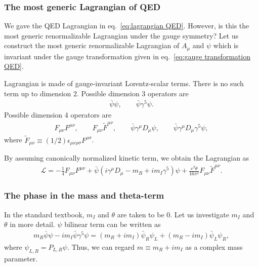 \documentclass[11pt,a4paper]{article}
\begin{document}
\subsubsection{The most generic Lagrangian of QED}
We gave the QED Lagrangian in eq.~\eqref{eq:lagrangian QED}. However, is this the most generic renormalizable Lagrangian under the gauge symmetry?
Let us construct the most generic renormalizable Lagrangian of $A_\mu$ and $\psi$ which is invariant under the gauge transformation given in eq.~\eqref{eq:gauge transformation QED}.

Lagrangian is made of gauge-invariant Lorentz-scalar terms. There is no such term up to dimension 2.
Possible dimension 3 operators are
\begin{align}
    \bar\psi \psi, \qquad
    \bar\psi \gamma^5 \psi.
\end{align}
Possible dimension 4 operators are
\begin{align}
    F_{\mu\nu} F^{\mu\nu}, \qquad
    F_{\mu\nu} \tilde F^{\mu\nu}, \qquad
    \bar\psi \gamma^\mu D_\mu \psi, \qquad
    \bar\psi \gamma^\mu D_\mu \gamma^5 \psi,
\end{align}
where $\tilde F_{\mu\nu} \equiv (1/2) \epsilon_{\mu\nu\rho\sigma} F^{\rho\sigma}$.

By assuming canonically normalized kinetic term, we obtain the Lagrangian as
\begin{align}
    \mathcal{L} = -\frac{1}{4} F_{\mu\nu} F^{\mu\nu} + \bar\psi (i\gamma^\mu D_\mu - m_R + i m_I \gamma^5) \psi + \frac{e^2 \theta}{16\pi^2} F_{\mu\nu} \tilde F^{\mu\nu}. \label{eq:lagrangian QED2}
\end{align}

\subsubsection{The phase in the mass and theta-term}
In the standard textbook, $m_I$ and $\theta$ are taken to be $0$. Let us investigate $m_I$ and $\theta$ in more detail.
$\psi$ bilinear term can be written as
\begin{align}
    m_R \bar\psi \psi - i m_I \bar\psi \gamma^5 \psi
    =
    (m_R + i m_I) \bar\psi_R \psi_L + (m_R - i m_I) \bar\psi_L \psi_R,
\end{align}
where $\psi_{L,R} = P_{L,R} \psi$. Thus, we can regard $m \equiv m_R + i m_I$ as a complex mass parameter.
\end{document}
